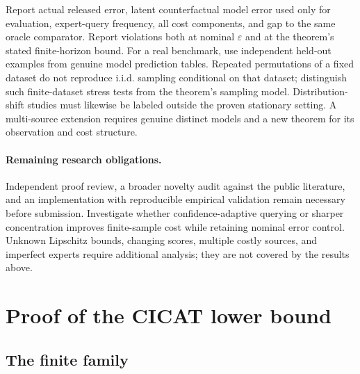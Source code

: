 \documentclass[11pt]{article}
\theoremstyle{remark}
\newcommand{\eps}{\varepsilon}
\begin{document}
Report actual released error, latent counterfactual model error used
only for evaluation, expert-query frequency, all cost components, and
gap to the same oracle comparator. Report violations both at nominal
$\eps$ and at the theorem's stated finite-horizon bound. For a real
benchmark, use independent held-out examples from genuine model
prediction tables. Repeated permutations of a fixed dataset do not
reproduce i.i.d. sampling conditional on that dataset; distinguish
such finite-dataset stress tests from the theorem's sampling model.
Distribution-shift studies must likewise be labeled outside the proven
stationary setting. A multi-source extension requires genuine distinct
models and a new theorem for its observation and cost structure.

\paragraph{Remaining research obligations.}
Independent proof review, a broader novelty audit against the public
literature, and an implementation with reproducible empirical validation
remain necessary before submission. Investigate
whether confidence-adaptive querying or sharper concentration improves
finite-sample cost while retaining nominal error control. Unknown
Lipschitz bounds, changing scores, multiple costly sources, and imperfect
experts require additional analysis; they are not covered by the results
above.

\appendix

\section{Proof of the CICAT lower bound}
\label{app:cicat}
\subsection{The finite family}
\label{sec:family}
\end{document}
